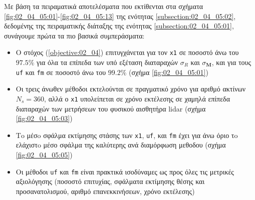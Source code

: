 Με βάση τα πειραματικά αποτελέσματα που εκτίθενται στα σχήματα
\ref{fig:02_04_05:01}-\ref{fig:02_04_05:13} της ενότητας
\ref{subsection:02_04_05:02}, δεδομένης της πειραματικής διάταξης της ενότητας
\ref{subsection:02_04_05:01}, συνάγουμε πρώτα τα πιο βασικά συμπεράσματα:

\begin{framed}
\begin{itemize}
  \item Ο στόχος (\ref{objective:02_04}) επιτυγχάνεται για τον \texttt{x1} σε
        ποσοστό άνω του $97.5\%$ για όλα τα επίπεδα των υπό εξέταση διαταραχών
        $\sigma_R$ και $\sigma_{\bm{M}}$, και για τους \texttt{uf} και
        \texttt{fm} σε ποσοστό άνω του $99.2\%$ (σχήμα \ref{fig:02_04_05:01})
  \item Οι τρεις άνωθεν μέθοδοι εκτελούνται σε πραγματικό χρόνο για αριθμό
        ακτίνων $N_s = 360$, αλλά ο \texttt{x1} υπολείπεται σε χρόνο εκτέλεσης
        σε χαμηλά επίπεδα διαταραχών των μετρήσεων του φυσικού αισθητήρα lidar
        (σχήμα \ref{fig:02_04_05:03})
  \item Τo μέσo σφάλμα εκτίμησης στάσης των \texttt{x1}, \texttt{uf}, και
        \texttt{fm} έχει για άνω όριο τo ελάχιστo μέσο σφάλμα της καλύτερης
        ανά διαμόρφωση μεθοδου (σχήμα \ref{fig:02_04_05:05})
  \item Οι μέθοδοι \texttt{uf} και \texttt{fm} είναι πρακτικά ισοδύναμες ως προς
        όλες τις μετρικές αξιολόγησης (ποσοστό επιτυχίας, σφάλματα εκτίμησης
        θέσης και προσανατολισμού, αριθμό επανεκκινήσεων, χρόνο εκτέλεσης)
\end{itemize}
\end{framed}

